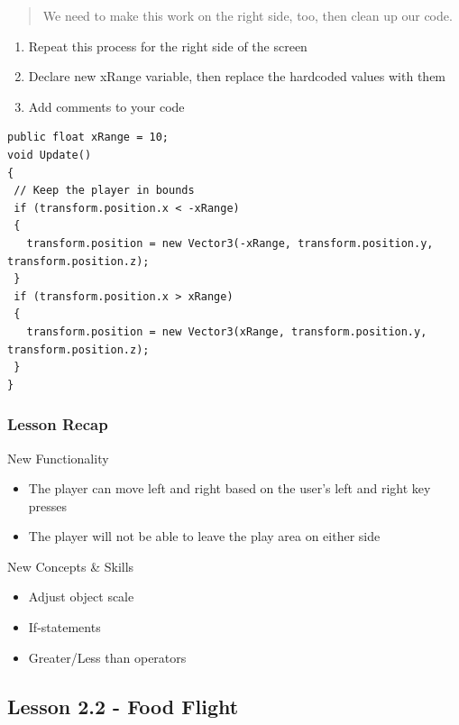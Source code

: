 \documentclass[
]{book}
\providecommand{\tightlist}{%
  \setlength{\itemsep}{0pt}\setlength{\parskip}{0pt}}
\begin{document}
\begin{quote}
We need to make this work on the right side, too, then clean up our code.
\end{quote}

\begin{enumerate}
\def\labelenumi{\arabic{enumi}.}
\tightlist
\item
  Repeat this process for the right side of the screen
\item
  Declare new xRange variable, then replace the hardcoded values with them
\item
  Add comments to your code
\end{enumerate}

\begin{verbatim}
public float xRange = 10;
void Update()
{
 // Keep the player in bounds
 if (transform.position.x < -xRange)
 {
   transform.position = new Vector3(-xRange, transform.position.y, transform.position.z);
 }
 if (transform.position.x > xRange)
 {
   transform.position = new Vector3(xRange, transform.position.y, transform.position.z);
 }
}
\end{verbatim}

\hypertarget{lesson-recap}{%
\subsubsection{Lesson Recap}\label{lesson-recap}}

New Functionality

\begin{itemize}
\tightlist
\item
  The player can move left and right based on the user's left and right key presses
\item
  The player will not be able to leave the play area on either side
\end{itemize}

New Concepts \& Skills

\begin{itemize}
\tightlist
\item
  Adjust object scale
\item
  If-statements
\item
  Greater/Less than operators
\end{itemize}

\hypertarget{lesson-2.2---food-flight}{%
\subsection{Lesson 2.2 - Food Flight}\label{lesson-2.2---food-flight}}
\end{document}
